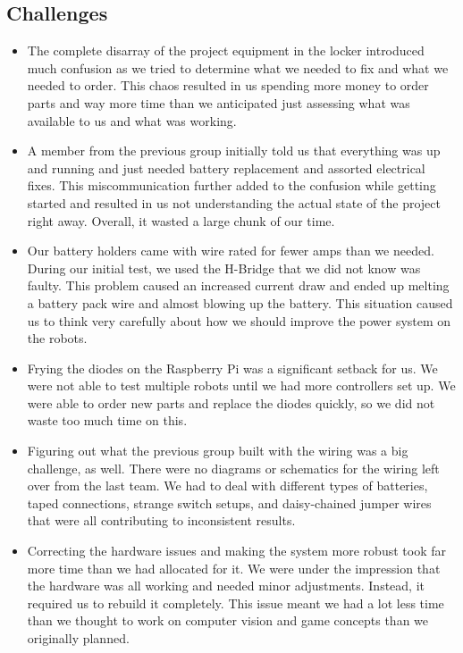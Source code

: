 \documentclass[a4paper,12pt]{article}
\begin{document}
\subsection{Challenges}
	\begin{itemize}
		\item The complete disarray of the project equipment in the locker introduced much confusion as we tried to determine what we needed to fix and what we needed to order. This chaos resulted in us spending more money to order parts and way more time than we anticipated just assessing what was available to us and what was working.
		\item A member from the previous group initially told us that everything was up and running and just needed battery replacement and assorted electrical fixes. This miscommunication further added to the confusion while getting started and resulted in us not understanding the actual state of the project right away. Overall, it wasted a large chunk of our time.
		\item Our battery holders came with wire rated for fewer amps than we needed. During our initial test, we used the H-Bridge that we did not know was faulty. This problem caused an increased current draw and ended up melting a battery pack wire and almost blowing up the battery. This situation caused us to think very carefully about how we should improve the power system on the robots.
		\item Frying the diodes on the Raspberry Pi was a significant setback for us. We were not able to test multiple robots until we had more controllers set up. We were able to order new parts and replace the diodes quickly, so we did not waste too much time on this.
		\item Figuring out what the previous group built with the wiring was a big challenge, as well. There were no diagrams or schematics for the wiring left over from the last team. We had to deal with different types of batteries, taped connections, strange switch setups, and daisy-chained jumper wires that were all contributing to inconsistent results.
		\item Correcting the hardware issues and making the system more robust took far more time than we had allocated for it. We were under the impression that the hardware was all working and needed minor adjustments. Instead, it required us to rebuild it completely. This issue meant we had a lot less time than we thought to work on computer vision and game concepts than we originally planned.
	\end{itemize}
\end{document}

